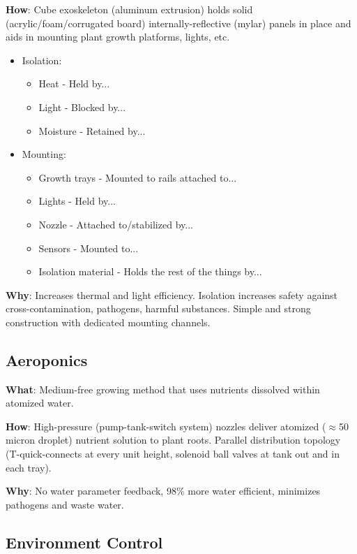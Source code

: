 \documentclass{report}
\begin{document}
\textbf{How}: Cube exoskeleton (aluminum extrusion) holds solid (acrylic/foam/corrugated board) internally-reflective (mylar) panels in place and aids in mounting plant growth platforms, lights, etc.
\begin{itemize}
    \item Isolation:
    \begin{itemize}
        \item Heat - Held by...
        \item Light - Blocked by...
        \item Moisture - Retained by...
    \end{itemize}
    \item Mounting:
    \begin{itemize}
        \item Growth trays - Mounted to rails attached to...
        \item Lights - Held by...
        \item Nozzle - Attached to/stabilized by...
        \item Sensors - Mounted to...
        \item Isolation material - Holds the rest of the things by...
    \end{itemize}
\end{itemize}

\textbf{Why}: Increases thermal and light efficiency. Isolation increases safety against cross-contamination, pathogens, harmful substances. Simple and strong construction with dedicated mounting channels.

\newpage

\subsection{Aeroponics}
\label{sec:aeroponics}

\textbf{What}: Medium-free growing method that uses nutrients dissolved within atomized water.

\textbf{How}: High-pressure (pump-tank-switch system) nozzles deliver atomized ($\approx$50 micron droplet) nutrient solution to plant roots. Parallel distribution topology (T-quick-connects at every unit height, solenoid ball valves at tank out and in each tray).

\textbf{Why}: No water parameter feedback, 98\% more water efficient, minimizes pathogens and waste water.

\subsection{Environment Control}
\label{sec:environment}
\end{document}
